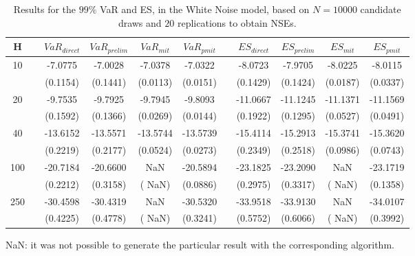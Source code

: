 \begin{table}[h] 
\centering 
\caption{Results for the $99\%$ VaR and ES, in the White Noise model, based on $N=10000$ candidate draws and $20$ replications to obtain NSEs.} 
\label{tab:res_algos_WN} 
\begin{tabular}{ccccccccccc}  
 H & & $VaR_{direct}$ & $VaR_{prelim}$ & $VaR_{mit}$  & $VaR_{pmit}$ &  & $ES_{direct}$ & $ES_{prelim}$ & $ES_{mit}$ & $ES_{pmit}$ \\ \hline 
10 & & -7.0775 & -7.0028 & -7.0378 & -7.0322 & & -8.0723 & -7.9705 & -8.0225 & -8.0115  \\ 
 & & (0.1154) & (0.1441) & (0.0113) & (0.0151) & & (0.1429) & (0.1424) & (0.0187) & (0.0337)   \\ [1ex] 
20 & & -9.7535 & -9.7925 & -9.7945 & -9.8093 & & -11.0667 & -11.1245 & -11.1371 & -11.1569  \\ 
 & & (0.1592) & (0.1366) & (0.0269) & (0.0144) & & (0.1922) & (0.1295) & (0.0527) & (0.0491)   \\ [1ex] 
40 & & -13.6152 & -13.5571 & -13.5744 & -13.5739 & & -15.4114 & -15.2913 & -15.3741 & -15.3620  \\ 
 & & (0.2219) & (0.2177) & (0.0524) & (0.0273) & & (0.2349) & (0.2518) & (0.0986) & (0.0743)   \\ [1ex] 
100 & & -20.7184 & -20.6600 &    NaN & -20.5894 & & -23.1825 & -23.2090 &    NaN & -23.1719  \\ 
 & & (0.2212) & (0.3158) & (   NaN) & (0.0886) & & (0.2975) & (0.3317) & (   NaN) & (0.1358)   \\ [1ex] 
250 & & -30.4598 & -30.4319 &    NaN & -30.5320 & & -33.9518 & -33.9130 &    NaN & -34.0107  \\ 
 & & (0.4225) & (0.4778) & (   NaN) & (0.3241) & & (0.5752) & (0.6066) & (   NaN) & (0.3992)   \\ [1ex] 
\hline 
\end{tabular} 
\raggedright 

\vspace{5pt}\footnotesize{NaN: it was not possible to generate the particular result with the corresponding algorithm.} 
\end{table} 
